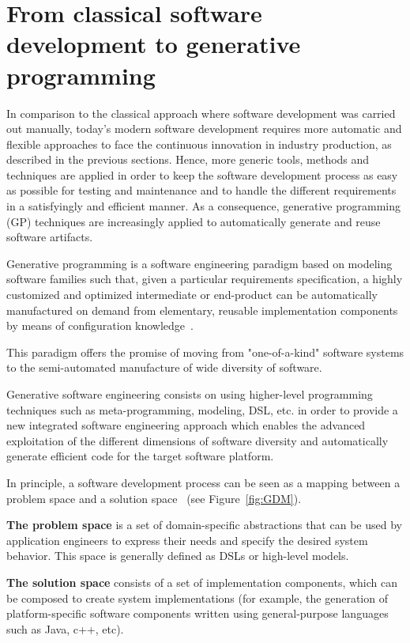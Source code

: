 \section{From classical software development to generative programming}
\label{sec:FROM} 
In comparison to the classical approach where software development was carried out manually, today’s modern software development requires more automatic and flexible approaches to face the continuous innovation in industry production, as described in the previous sections.
Hence, more generic tools, methods and techniques are applied in order to keep the software development process as easy as possible for testing and maintenance and to handle the different requirements in a satisfyingly and efficient manner.
As a consequence, generative programming (GP) techniques are increasingly applied to automatically generate and reuse software artifacts.
\begin{mydef}
		Generative programming is a software engineering paradigm based on modeling software families such that, given a particular requirements specification, a highly customized and optimized intermediate or end-product can be automatically manufactured on demand from elementary, reusable implementation components by means of configuration knowledge~\cite{Czarnecki:2000:GPM:345203}.
\end{mydef}

This paradigm offers the promise of moving from "one-of-a-kind" software systems to the semi-automated manufacture of wide diversity of software.

Generative software engineering consists on using higher-level programming techniques such as meta-programming, modeling, DSL, etc. in order to provide a new integrated software engineering approach which enables the advanced exploitation of the different dimensions of software diversity and automatically generate efficient code for the target software platform. 

In principle, a software development process can be seen as a mapping between a problem space and a solution space~\cite{czarnecki2005overview} (see Figure~\ref{fig:GDM}). 

\textbf{The problem space} is a set of domain-specific abstractions that can be used by application engineers to express their needs and specify the desired system behavior. This space is generally defined  as DSLs or high-level models. 

\textbf{The solution space} consists of a set of implementation components, which can be composed to create system implementations (for example, the generation of platform-specific software components written using general-purpose languages such as Java, c++, etc).

